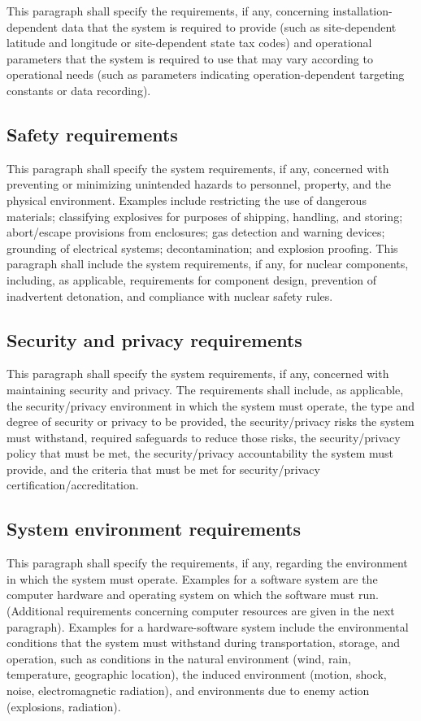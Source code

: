 \documentclass{fidata-report-template}
\begin{document}
This paragraph shall specify the requirements, if any, concerning
installation-dependent data that the system is required to provide (such
as site-dependent latitude and longitude or site-dependent state tax
codes) and operational parameters that the system is required to use
that may vary according to operational needs (such as parameters
indicating operation-dependent targeting constants or data recording).

\subsection{Safety requirements}

This paragraph shall specify the system requirements, if any, concerned
with preventing or minimizing unintended hazards to personnel, property,
and the physical environment. Examples include restricting the use of
dangerous materials; classifying explosives for purposes of shipping,
handling, and storing; abort/escape provisions from enclosures; gas
detection and warning devices; grounding of electrical systems;
decontamination; and explosion proofing. This paragraph shall include
the system requirements, if any, for nuclear components, including, as
applicable, requirements for component design, prevention of inadvertent
detonation, and compliance with nuclear safety rules.

\subsection{Security and privacy requirements}

This paragraph shall specify the system requirements, if any, concerned
with maintaining security and privacy. The requirements shall include,
as applicable, the security/privacy environment in which the system must
operate, the type and degree of security or privacy to be provided, the
security/privacy risks the system must withstand, required safeguards to
reduce those risks, the security/privacy policy that must be met, the
security/privacy accountability the system must provide, and the
criteria that must be met for security/privacy
certification/accreditation.

\subsection{System environment requirements}

This paragraph shall specify the requirements, if any, regarding the
environment in which the system must operate. Examples for a software
system are the computer hardware and operating system on which the
software must run. (Additional requirements concerning computer
resources are given in the next paragraph). Examples for a
hardware-software system include the environmental conditions that the
system must withstand during transportation, storage, and operation,
such as conditions in the natural environment (wind, rain, temperature,
geographic location), the induced environment (motion, shock, noise,
electromagnetic radiation), and environments due to enemy action
(explosions, radiation).
\end{document}
